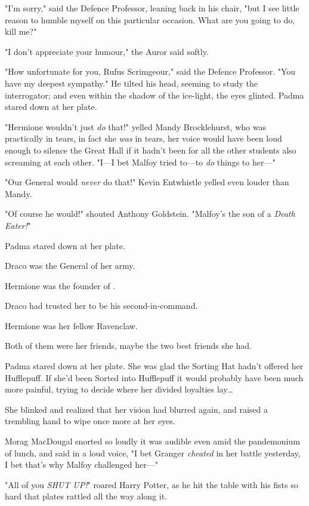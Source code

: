 "I'm sorry," said the Defence Professor, leaning back in his chair, "but I see
little reason to humble myself on this particular occasion. What are you going
to do, kill me?"

"I don't appreciate your humour," the Auror said softly.

"How unfortunate for you, Rufus Scrimgeour," said the Defence Professor. "You
have my deepest sympathy." He tilted his head, seeming to study the
interrogator; and even within the shadow of the ice-light, the eyes glinted.
\later
Padma stared down at her plate.

"Hermione wouldn't just \emph{do} that!" yelled Mandy Brocklehurst, who was
practically in tears, in fact she \emph{was} in tears, her voice would have
been loud enough to silence the Great Hall if it hadn't been for all the other
students also screaming at each other. "I—I bet Malfoy tried to—to
\emph{do} things to her—"

"Our General would \emph{never} do that!" Kevin Entwhistle yelled even louder
than Mandy.

"Of course he would!" shouted Anthony Goldstein. "Malfoy's the son of a
\emph{Death Eater!}"

Padma stared down at her plate.

Draco was the General of her army.

Hermione was the founder of \SPHEW.

Draco had trusted her to be his second-in-command.

Hermione was her fellow Ravenclaw.

Both of them were her friends, maybe the two best friends she had.

Padma stared down at her plate. She was glad the Sorting Hat hadn't offered her
Hufflepuff. If she'd been Sorted into Hufflepuff it would probably have been
much more painful, trying to decide where her divided loyalties lay…

She blinked and realized that her vision had blurred again, and raised a
trembling hand to wipe once more at her eyes.

Morag MacDougal snorted so loudly it was audible even amid the pandemonium of
lunch, and said in a loud voice, "I bet Granger \emph{cheated} in her battle
yesterday, I bet that's why Malfoy challenged her—"

"All of you \emph{SHUT UP!}" roared Harry Potter, as he hit the table with his
fists so hard that plates rattled all the way along it.

